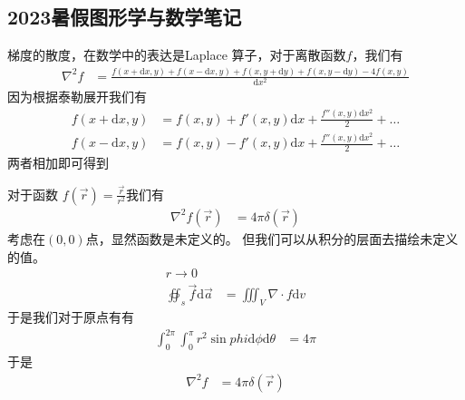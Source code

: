 \ifx\allfiles\undefined


\chapter{}
\section{2023暑假图形学与数学笔记}
\else
\fi

\begin{thm}[离散函数的梯度的散度的计算方式]
梯度的散度，在数学中的表达是Laplace 算子，对于离散函数$ f $，我们有
\begin{align*}
\nabla^2 f &= \frac{f(x+\mathrm{d}x,y) + f(x-\mathrm{d}x,y) + f(x,y+\mathrm{d}y)+ f(x,y-\mathrm{d}y)  - 4f(x,y) }{\mathrm{d}x^2 }  
\end{align*}
因为根据泰勒展开我们有
\begin{align*}
f(x+\mathrm{d}x ,y) &=  f(x,y) + f'(x,y)\mathrm{d}x + \frac{f''(x,y) \mathrm{d}x^2}{2}  +\ldots\\
f(x-\mathrm{d}x ,y) &=  f(x,y) - f'(x,y)\mathrm{d}x + \frac{f''(x,y) \mathrm{d}x^2}{2}  +\ldots
\end{align*}	
两者相加即可得到
\end{thm}

\begin{thm}[$ f(\vec r) = \frac{\vec r}{r^3}$的梯度的散度 ]
		对于函数  $f(\vec r) = \frac{\vec r}{r^2}$我们有
		\begin{align*}
				\nabla^2 f(\vec r) &=  4\pi \delta (\vec r)  
		\end{align*}
		考虑在$ (0,0) $点，显然函数是未定义的。
		但我们可以从积分的层面去描绘未定义的值。
		\begin{align*}
			r \to  0 \\	
			\oiint_s \vec f \mathrm{d}   \vec a  &= \iiint_V \nabla \cdot f \mathrm{d} v   
		\end{align*}
		于是我们对于原点有有 
		\begin{align*}
			\int_{0}^{ 2\pi } \int_{0}^{ \pi } r^2\sin phi\mathrm{d}  \phi \mathrm{d}  \theta&=   4\pi 
		\end{align*}
		于是
		\begin{align*}
							\nabla ^2 f &=  4\pi \delta (\vec r)
		\end{align*}
		
\end{thm}

